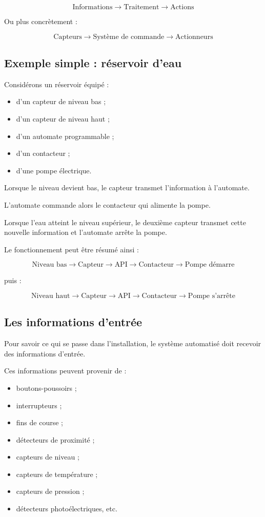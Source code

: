\documentclass[12pt,a4paper]{book}
\begin{document}
\[
\text{Informations} \rightarrow \text{Traitement} \rightarrow \text{Actions}
\]

Ou plus concrètement :

\[
\text{Capteurs} \rightarrow \text{Système de commande} \rightarrow \text{Actionneurs}
\]

\subsection{Exemple simple : réservoir d'eau}

Considérons un réservoir équipé :

\begin{itemize}
    \item d'un capteur de niveau bas ;
    \item d'un capteur de niveau haut ;
    \item d'un automate programmable ;
    \item d'un contacteur ;
    \item d'une pompe électrique.
\end{itemize}

Lorsque le niveau devient bas, le capteur transmet l'information à l'automate.

L'automate commande alors le contacteur qui alimente la pompe.

Lorsque l'eau atteint le niveau supérieur, le deuxième capteur transmet cette nouvelle information et l'automate arrête la pompe.

Le fonctionnement peut être résumé ainsi :

\[
\text{Niveau bas} \rightarrow \text{Capteur} \rightarrow \text{API} \rightarrow \text{Contacteur} \rightarrow \text{Pompe démarre}
\]

puis :

\[
\text{Niveau haut} \rightarrow \text{Capteur} \rightarrow \text{API} \rightarrow \text{Contacteur} \rightarrow \text{Pompe s'arrête}
\]

\subsection{Les informations d'entrée}

Pour savoir ce qui se passe dans l'installation, le système automatisé doit recevoir des informations d'entrée.

Ces informations peuvent provenir de :

\begin{itemize}
    \item boutons-poussoirs ;
    \item interrupteurs ;
    \item fins de course ;
    \item détecteurs de proximité ;
    \item capteurs de niveau ;
    \item capteurs de température ;
    \item capteurs de pression ;
    \item détecteurs photoélectriques, etc.
\end{itemize}
\end{document}

